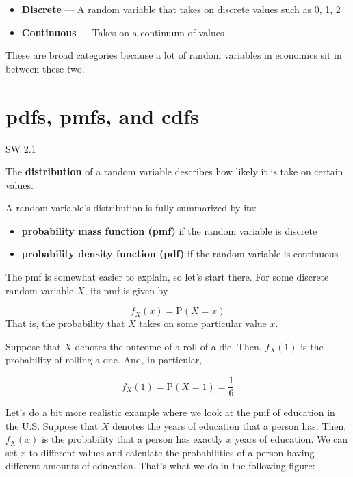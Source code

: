 \documentclass[
  letterpaper,
  DIV=11,
  numbers=noendperiod]{scrreprt}
\begin{document}
\begin{itemize}
\item
  \textbf{Discrete} --- A random variable that takes on discrete values
  such as 0, 1, 2
\item
  \textbf{Continuous} --- Takes on a continuum of values
\end{itemize}

These are broad categories because a lot of random variables in
economics sit in between these two.

\section{pdfs, pmfs, and cdfs}\label{pdfs-pmfs-and-cdfs}

SW 2.1

The \textbf{distribution} of a random variable describes how likely it
is take on certain values.

A random variable's distribution is fully summarized by its:

\begin{itemize}
\item
  \textbf{probability mass function (pmf)} if the random variable is
  discrete
\item
  \textbf{probability density function (pdf)} if the random variable is
  continuous
\end{itemize}

The pmf is somewhat easier to explain, so let's start there. For some
discrete random variable \(X\), its pmf is given by

\[
  f_X(x) = \mathrm{P}(X=x)
\] That is, the probability that \(X\) takes on some particular value
\(x\).

Suppose that \(X\) denotes the outcome of a roll of a die. Then,
\(f_X(1)\) is the probability of rolling a one. And, in particular,

\[
  f_X(1) = \mathrm{P}(X=1) = \frac{1}{6}
\]

Let's do a bit more realistic example where we look at the pmf of
education in the U.S. Suppose that \(X\) denotes the years of education
that a person has. Then, \(f_X(x)\) is the probability that a person has
exactly \(x\) years of education. We can set \(x\) to different values
and calculate the probabilities of a person having different amounts of
education. That's what we do in the following figure:
\end{document}
